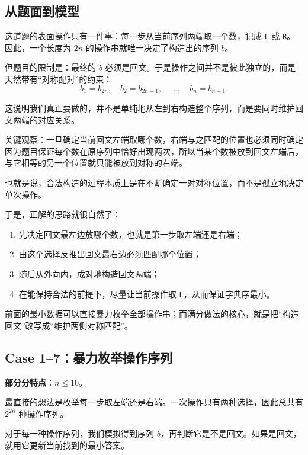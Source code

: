 \documentclass{book}
\newcommand{\code}[1]{\colorbox{codebg}{\texttt{#1}}}  %
\begin{document}
\subsection{从题面到模型}

这道题的表面操作只有一件事：每一步从当前序列两端取一个数，记成 \code{L} 或 \code{R}。因此，一个长度为 $2n$ 的操作串就唯一决定了构造出的序列 $b$。

但题目的限制是：最终的 $b$ 必须是回文。于是操作之间并不是彼此独立的，而是天然带有“对称配对”的约束：
\[
b_1=b_{2n},\quad b_2=b_{2n-1},\quad \dots,\quad b_n=b_{n+1}.
\]

这说明我们真正要做的，并不是单纯地从左到右构造整个序列，而是要同时维护回文两端的对应关系。

\begin{keybox}{关键观察：一旦确定当前回文左端取哪个数，右端与之匹配的位置也必须同时确定}
因为题目保证每个数在原序列中恰好出现两次，所以当某个数被放到回文左端后，与它相等的另一个位置就只能被放到对称的右端。

也就是说，合法构造的过程本质上是在不断确定一对对称位置，而不是孤立地决定单次操作。
\end{keybox}

于是，正解的思路就很自然了：

\begin{enumerate}[leftmargin=2em,itemsep=1pt,topsep=2pt,parsep=0pt,partopsep=0pt]
    \item 先决定回文最左边放哪个数，也就是第一步取左端还是右端；
    \item 由这个选择反推出回文最右边必须匹配哪个位置；
    \item 随后从外向内，成对地构造回文两端；
    \item 在能保持合法的前提下，尽量让当前操作取 \code{L}，从而保证字典序最小。
\end{enumerate}

前面的最小数据可以直接暴力枚举全部操作串；而满分做法的核心，就是把“构造回文”改写成“维护两侧对称匹配”。
\newpage
\subsection{Case 1--7：暴力枚举操作序列}

\textbf{部分分特点}：$n\le 10$。

最直接的想法是枚举每一步取左端还是右端。一次操作只有两种选择，因此总共有 $2^{2n}$ 种操作序列。

对于每一种操作序列，我们模拟得到序列 $b$，再判断它是不是回文。如果是回文，就用它更新当前找到的最小答案。
\end{document}
